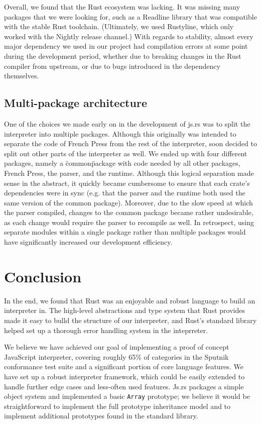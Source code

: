 \documentclass{article}
\begin{document}
\begin{multicols}{2}
Overall, we found that the Rust ecosystem was lacking. It was missing many
packages that we were looking for, such as a Readline library that was
compatible with the stable Rust toolchain. (Ultimately, we used
Rustyline\cite{rustyline}, which only worked with the Nightly release channel.)
With regards to stability, almost every major dependency we used in our project
had compilation errors at some point during the development period, whether due
to breaking changes in the Rust compiler from upstream, or due to bugs
introduced in the dependency themselves.

\subsection*{Multi-package architecture}

One of the choices we made early on in the development of js.rs was to split the
interpreter into multiple packages. Although this originally was intended to
separate the code of French Press from the rest of the interpreter, soon decided
to split out other parts of the interpreter as well. We ended up with four
different packages, namely a \"common\" package with code needed by all other
packages, French Press, the parser, and the runtime. Although this logical
separation made sense in the abstract, it quickly became cumbersome to ensure
that each crate's dependencies were in sync (e.g. that the parser and the
runtime both used the same version of the common package). Moreover, due to the
slow speed at which the parser compiled, changes to the common package became
rather undesirable, as each change would require the parser to recompile as
well. In retrospect, using separate modules within a single package rather than
multiple packages would have significantly increased our development efficiency.

\section{Conclusion}

In the end, we found that Rust was an enjoyable and robust language to build an
interpreter in. The high-level abstractions and type system that Rust provides
made it easy to bulld the structure of our interpreter, and Rust's standard
library helped set up a thorough error handling system in the inteprreter.
\newline

We believe we have achieved our goal of implementing a proof of concept
JavaScript interpreter, covering roughly 65\% of categories in the Sputnik
conformance test suite and a significant portion of core language features. We
have set up a robust interpreter framework, which could be easily extended to
handle further edge cases and less-often used features. Js.rs packages a simple
object system and implemented a basic \texttt{Array} prototype; we believe it
would be straightforward to implement the full prototype inheritance model and
to implement additional prototypes found in the standard library. \newline


\end{multicols}
\end{document}
